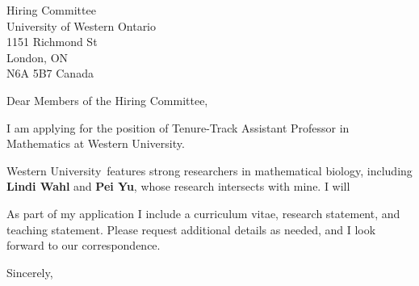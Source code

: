 \documentclass[11pt,a4paper]{letter}
\begin{document}
\def\School{Western University}
\begin{letter}
{Hiring Committee\\
University of Western Ontario\\
1151 Richmond St\\
London, ON\\
N6A 5B7 Canada}


\opening{Dear Members of the Hiring Committee,}

I am applying for the position of Tenure-Track Assistant Professor in Mathematics at \School. 



\School~features strong researchers in mathematical biology, including \textbf{Lindi Wahl} and \textbf{Pei Yu}, whose research intersects with mine. I will 



As part of my application I include a curriculum vitae, research statement, and teaching statement. Please request additional details as needed, and I look forward to our correspondence.

\closing{Sincerely,}
\end{letter}
\end{document}
